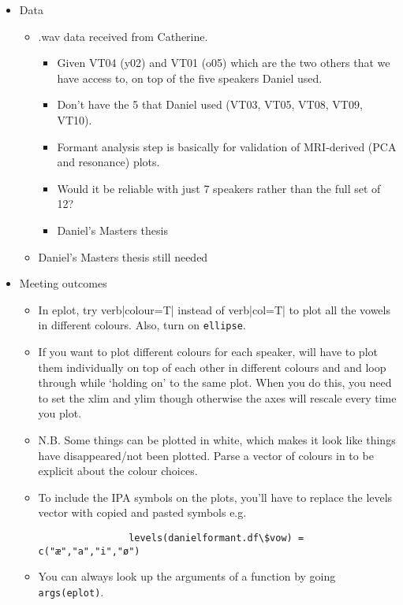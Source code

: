 \documentclass{article}
\begin{document}
\begin{itemize}
\begin{itemize}
\begin{itemize}
        \end{itemize}
        \item Data
        \begin{itemize}
            \item .wav data received from Catherine.
            \begin{itemize}
                \item Given VT04 (y02) and VT01 (o05) which are the two others that we have access to, on top of the five speakers Daniel used.
                \item Don’t have the 5 that Daniel used (VT03, VT05, VT08, VT09, VT10).
                \item Formant analysis step is basically for validation of MRI-derived (PCA and resonance) plots.
                \item Would it be reliable with just 7 speakers rather than the full set of 12?
                \item Daniel’s Masters thesis
            \end{itemize}
            \item Daniel's Masters thesis still needed
        \end{itemize}
        \item Meeting outcomes
        \begin{itemize}
            \item In eplot, try verb|colour=T| instead of verb|col=T| to plot all the vowels in different colours. Also, turn on \verb|ellipse|.
            \item If you want to plot different colours for each speaker, will have to plot them individually on top of each other in different colours and and loop through while `holding on' to the same plot. When you do this, you need to set the xlim and ylim though otherwise the axes will rescale every time you plot.
            \item N.B. Some things can be plotted in white, which makes it look like things have disappeared/not been plotted. Parse a vector of colours in to be explicit about the colour choices.
            \item To include the IPA symbols on the plots, you'll have to replace the levels vector with copied and pasted symbols e.g. \begin{verbatim}
                levels(danielformant.df\$vow) = c("æ","a","i","ø")
            \end{verbatim}
            \item You can always look up the arguments of a function by going \verb|args(eplot)|.

\end{itemize}
\end{itemize}
\end{itemize}
\end{document}
